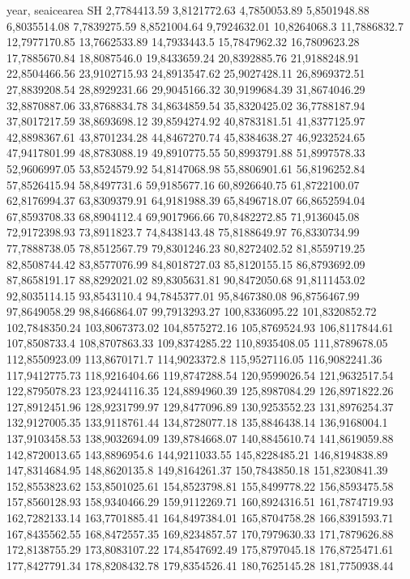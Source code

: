 year,    seaicearea SH
2,7784413.59
3,8121772.63
4,7850053.89
5,8501948.88
6,8035514.08
7,7839275.59
8,8521004.64
9,7924632.01
10,8264068.3
11,7886832.7
12,7977170.85
13,7662533.89
14,7933443.5
15,7847962.32
16,7809623.28
17,7885670.84
18,8087546.0
19,8433659.24
20,8392885.76
21,9188248.91
22,8504466.56
23,9102715.93
24,8913547.62
25,9027428.11
26,8969372.51
27,8839208.54
28,8929231.66
29,9045166.32
30,9199684.39
31,8674046.29
32,8870887.06
33,8768834.78
34,8634859.54
35,8320425.02
36,7788187.94
37,8017217.59
38,8693698.12
39,8594274.92
40,8783181.51
41,8377125.97
42,8898367.61
43,8701234.28
44,8467270.74
45,8384638.27
46,9232524.65
47,9417801.99
48,8783088.19
49,8910775.55
50,8993791.88
51,8997578.33
52,9606997.05
53,8524579.92
54,8147068.98
55,8806901.61
56,8196252.84
57,8526415.94
58,8497731.6
59,9185677.16
60,8926640.75
61,8722100.07
62,8176994.37
63,8309379.91
64,9181988.39
65,8496718.07
66,8652594.04
67,8593708.33
68,8904112.4
69,9017966.66
70,8482272.85
71,9136045.08
72,9172398.93
73,8911823.7
74,8438143.48
75,8188649.97
76,8330734.99
77,7888738.05
78,8512567.79
79,8301246.23
80,8272402.52
81,8559719.25
82,8508744.42
83,8577076.99
84,8018727.03
85,8120155.15
86,8793692.09
87,8658191.17
88,8292021.02
89,8305631.81
90,8472050.68
91,8111453.02
92,8035114.15
93,8543110.4
94,7845377.01
95,8467380.08
96,8756467.99
97,8649058.29
98,8466864.07
99,7913293.27
100,8336095.22
101,8320852.72
102,7848350.24
103,8067373.02
104,8575272.16
105,8769524.93
106,8117844.61
107,8508733.4
108,8707863.33
109,8374285.22
110,8935408.05
111,8789678.05
112,8550923.09
113,8670171.7
114,9023372.8
115,9527116.05
116,9082241.36
117,9412775.73
118,9216404.66
119,8747288.54
120,9599026.54
121,9632517.54
122,8795078.23
123,9244116.35
124,8894960.39
125,8987084.29
126,8971822.26
127,8912451.96
128,9231799.97
129,8477096.89
130,9253552.23
131,8976254.37
132,9127005.35
133,9118761.44
134,8728077.18
135,8846438.14
136,9168004.1
137,9103458.53
138,9032694.09
139,8784668.07
140,8845610.74
141,8619059.88
142,8720013.65
143,8896954.6
144,9211033.55
145,8228485.21
146,8194838.89
147,8314684.95
148,8620135.8
149,8164261.37
150,7843850.18
151,8230841.39
152,8553823.62
153,8501025.61
154,8523798.81
155,8499778.22
156,8593475.58
157,8560128.93
158,9340466.29
159,9112269.71
160,8924316.51
161,7874719.93
162,7282133.14
163,7701885.41
164,8497384.01
165,8704758.28
166,8391593.71
167,8435562.55
168,8472557.35
169,8234857.57
170,7979630.33
171,7879626.88
172,8138755.29
173,8083107.22
174,8547692.49
175,8797045.18
176,8725471.61
177,8427791.34
178,8208432.78
179,8354526.41
180,7625145.28
181,7750938.44

